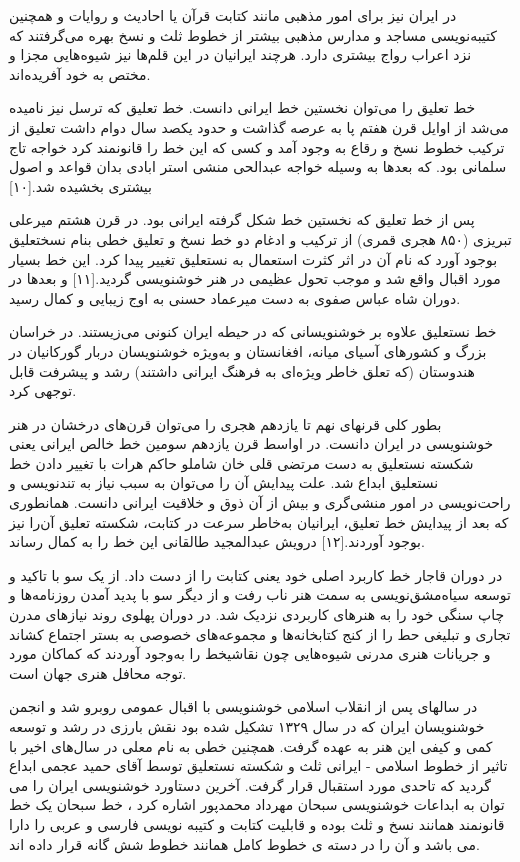 \documentclass[a4paper]{article}
\begin{document}
\begin{flushright}
در ایران نیز برای امور مذهبی مانند کتابت قرآن یا احادیث و روایات و همچنین کتیبه‌نویسی مساجد و مدارس مذهبی بیشتر از خطوط ثلث و نسخ بهره می‌گرفتند که نزد اعراب رواج بیشتری دارد. هرچند ایرانیان در این قلم‌ها نیز شیوه‌هایی مجزا و مختص به خود آفریده‌اند.

خط تعلیق را می‌توان نخستین خط ایرانی دانست. خط تعلیق که ترسل نیز نامیده می‌شد از اوایل قرن هفتم پا به عرصه گذاشت و حدود یکصد سال دوام داشت تعلیق از ترکیب خطوط نسخ و رقاع به وجود آمد و کسی که این خط را قانونمند کرد خواجه تاج سلمانی بود. که بعدها به وسیله خواجه عبدالحی منشی استر ابادی بدان قواعد و اصول بیشتری بخشیده شد.[۱۰]

پس از خط تعلیق که نخستین خط شکل گرفته ایرانی بود. در قرن هشتم میرعلی تبریزی (۸۵۰ هجری قمری) از ترکیب و ادغام دو خط نسخ و تعلیق خطی بنام نسختعلیق بوجود آورد که نام آن در اثر کثرت استعمال به نستعلیق تغییر پیدا کرد. این خط بسیار مورد اقبال واقع شد و موجب تحول عظیمی در هنر خوشنویسی گردید.[۱۱] و بعدها در دوران شاه عباس صفوی به دست میرعماد حسنی به اوج زیبایی و کمال رسید.

خط نستعلیق علاوه بر خوشنویسانی که در حیطه ایران کنونی می‌زیستند. در خراسان بزرگ و کشورهای آسیای میانه، افغانستان و به‌ویژه خوشنویسان دربار گورکانیان در هندوستان (که تعلق خاطر ویژه‌ای به فرهنگ ایرانی داشتند) رشد و پیشرفت قابل توجهی کرد.

بطور کلی قرنهای نهم تا یازدهم هجری را می‌توان قرن‌های درخشان در هنر خوشنویسی در ایران دانست. در اواسط قرن یازدهم سومین خط خالص ایرانی یعنی شکسته نستعلیق به دست مرتضی قلی خان شاملو حاکم هرات با تغییر دادن خط نستعلیق ابداع شد. علت پیدایش آن را می‌توان به سبب نیاز به تندنویسی و راحت‌نویسی در امور منشی‌گری و بیش از آن ذوق و خلاقیت ایرانی دانست. همانطوری که بعد از پیدایش خط تعلیق، ایرانیان به‌خاطر سرعت در کتابت، شکسته تعلیق آن‌را نیز بوجود آوردند.[۱۲] درویش عبدالمجید طالقانی این خط را به کمال رساند.

در دوران قاجار خط کاربرد اصلی خود یعنی کتابت را از دست داد. از یک سو با تاکید و توسعه سیاه‌مشق‌نویسی به سمت هنر ناب رفت و از دیگر سو با پدید آمدن روزنامه‌ها و چاپ سنگی خود را به هنرهای کاربردی نزدیک شد. در دوران پهلوی روند نیازهای مدرن تجاری و تبلیغی حط را از کنج کتابخانه‌ها و مجموعه‌های خصوصی به بستر اجتماع کشاند و جریانات هنری مدرنی شیوه‌هایی چون نقاشیخط را به‌وجود آوردند که کماکان مورد توجه محافل هنری جهان است.

در سالهای پس از انقلاب اسلامی خوشنویسی با اقبال عمومی روبرو شد و انجمن خوشنویسان ایران که در سال ۱۳۲۹ تشکیل شده بود نقش بارزی در رشد و توسعه کمی و کیفی این هنر به عهده گرفت. همچنین خطی به نام معلی در سال‌های اخیر با تاثیر از خطوط اسلامی - ایرانی ثلث و شکسته نستعلیق توسط آقای حمید عجمی ابداع گردید که تاحدی مورد استقبال قرار گرفت. آخرین دستاورد خوشنویسی ایران را می توان به ابداعات خوشنویسی سبحان مهرداد محمدپور اشاره کرد ، خط سبحان یک خط قانونمند همانند نسخ و ثلث بوده و قابلیت کتابت و کتیبه نویسی فارسی و عربی را دارا می باشد و آن را در دسته ی خطوط کامل همانند خطوط شش گانه قرار داده اند.




\end{flushright}
\end{document}
